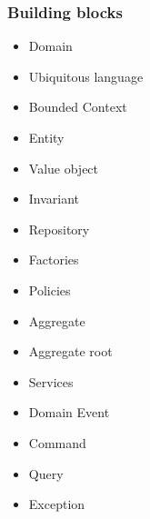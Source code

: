 \documentclass{beamer}
\begin{document}
\begin{frame}
\frametitle{\textbf{Building blocks}}
    
\begin{minipage}{0.4\textwidth}
\begin{center}
    
    \begin{shaded}
        \begin{itemize}
            \item Domain 
            \item Ubiquitous language
            \item Bounded Context
            \item Entity
            \item Value object
            \item Invariant
            \item Repository
        \end{itemize}
    \end{shaded}
\end{center}
\end{minipage}
\hspace{5mm}
\begin{minipage}{0.4\textwidth}
    \begin{itemize}
        \item Factories
        \item Policies
        \item Aggregate
        \item Aggregate root
        \item Services
        \item Domain Event
        \item Command
        \item Query
        \item Exception
    \end{itemize}	
\end{minipage}

\end{frame}

\end{document}
